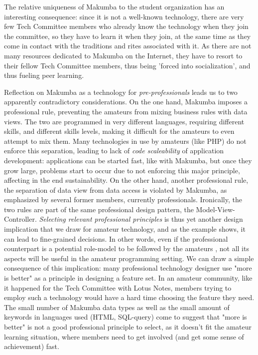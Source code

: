 \documentclass{sig-alt-release2}
\begin{document}
The relative uniqueness of Makumba to the student organization has an interesting consequence: since it is not a well-known technology, there are very few Tech Committee members who already know the technology when they join the committee, so they have to learn it when they join, at the same time as they come in contact with the traditions and rites associated with it. As there are not many resources dedicated to Makumba on the Internet, they have to resort to their fellow Tech Committee members, thus being 'forced into socialization', and thus fueling peer learning.


Reflection on Makumba as a technology for \textit{pre-professionals} \cite{stebbins79} leads us to two apparently contradictory considerations. On the one hand, Makumba imposes a professional rule, preventing the amateurs from mixing business rules with data views.  The two are programmed in very different languages, requiring different skills, and different skills levels, making  it difficult for the amateurs to even attempt to mix them. Many technologies in use by amateurs (like PHP) do not enforce this separation, leading to lack of \textit{code scaleability} of application development: applications can be started fast, like with Makumba, but once they grow large, problems start to occur due to not enforcing this major principle, affecting in the end sustainability. On the other hand, another professional rule, the separation of data view from data access is violated by Makumba, as emphasized by several former members, currently professionals. Ironically, the two rules are part of the same professional design pattern, the Model-View-Controller. \textit{Selecting relevant professional principles} is thus yet another design implication that we draw for amateur technology, and as the example shows, it can lead to fine-grained decisions. In other words, even if the professional counterpart is a potential role-model to be followed by the amateurs \cite{stebbins79}, not all its aspects will be useful in the amateur programming setting. We can draw a simple consequence of this implication: many professional technology designer use "more is better" as a principle in designing a feature set. In an amateur community, like it happened for the Tech Committee with Lotus Notes, members trying to employ such a technology would have a hard time choosing the feature they need. The small number of Makumba data types as well as the small amount of keywords in languages used (HTML, SQL-query) come to suggest that "more is better" is not a good professional principle to select, as it doesn't fit the amateur learning situation, where members need to get involved (and get some sense of achievement) fast. 
\end{document}
